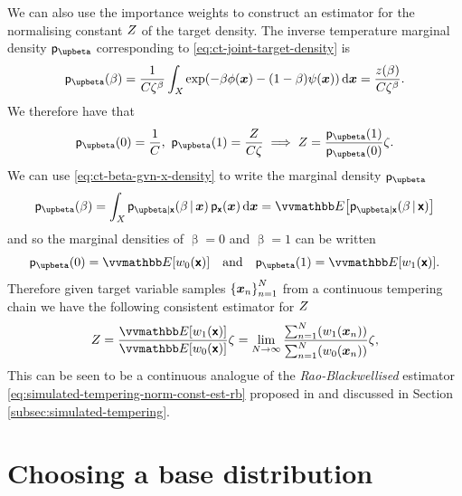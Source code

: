 We can also use the importance weights to construct an estimator for the normalising constant $Z$ of the target density. The inverse temperature marginal density $\pden{\upbeta}$ corresponding to \eqref{eq:ct-joint-target-density} is
\begin{equation}\label{eq:ct-beta-marginal}
\pden{\upbeta}(\beta) = 
\frac{1}{C\zeta^\beta} \int_{\set{X}} 
  \exp\lpa -\beta\phi(\vct{x}) -(1-\beta) \psi(\vct{x})\rpa
\,\dr\vct{x} =
\frac{\partfunc(\beta)}{C\zeta^\beta}.
\end{equation}
We therefore have that
\begin{equation}\label{eq:ct-beta-marginal-0-1}
\pden{\upbeta}(0) = \frac{1}{C},~
\pden{\upbeta}(1) = \frac{\normconst}{C \zeta}
\implies
\normconst = \frac{\pden{\upbeta}(1)}{\pden{\upbeta}(0)} \zeta.
\end{equation}
We can use \eqref{eq:ct-beta-gvn-x-density} to write the marginal density $\pden{\upbeta}$
\begin{equation}\label{eq:ct-beta-marginal-estimator}
\pden{\upbeta}(\beta) = 
\int_{\set{X}} \pden{\upbeta|\rvct{x}}(\beta \gvn \vct{x})\, \pden{\rvct{x}}(\vct{x}) \,\dr\vct{x} =
\expc{\pden{\upbeta|\rvct{x}}(\beta \gvn \rvct{x})}
\end{equation}
and so the marginal densities of $\upbeta=0$ and $\upbeta=1$ can be written
\begin{equation}\label{eq:ct-beta-marginal-0-1-estimators}
\pden{\upbeta}(0) = \expc{w_0(\rvct{x})}
\quad\textrm{and}\quad
\pden{\upbeta}(1) = \expc{w_1(\rvct{x})}.
\end{equation}
Therefore given target variable samples $\lbr \vct{x}_n\rbr_{n=1}^N$ from a continuous tempering chain we have the following consistent estimator for $Z$
\begin{equation}\label{eq:ct-norm-const-estimator}
\normconst = \frac{\expc{w_1(\rvct{x})}}{\expc{w_0(\rvct{x})}} \zeta = 
\lim_{N\to\infty} \frac
{\sum_{n=1}^N\lpa w_1\lpa \vct{x}_n\rpa\rpa}
{\sum_{n=1}^N\lpa w_0\lpa \vct{x}_n\rpa\rpa}
\zeta,
\end{equation}
This can be seen to be a continuous analogue of the \emph{Rao-Blackwellised} estimator \eqref{eq:simulated-tempering-norm-const-est-rb} proposed in \cite{carlson2016partition} and discussed in Section \ref{subsec:simulated-tempering}.

\section{Choosing a base distribution}\label{sec:choosing-base-density}

